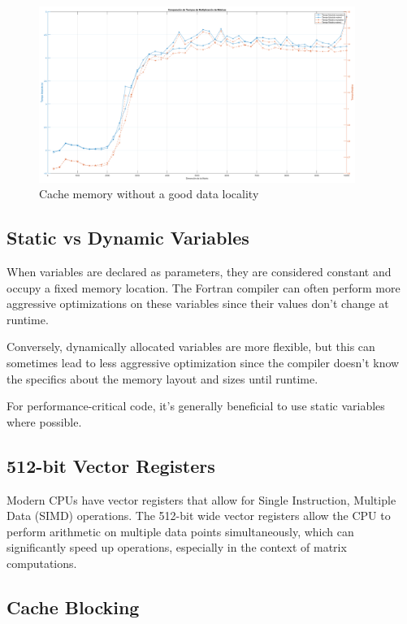 \vspace{0.3em}

\begin{figure}[H]
	\centering
	\includegraphics[width=103mm]{Figures/Imagenes/cache_problem.png}
   \caption{Cache memory without a good data locality}
\end{figure}

\clearpage


\subsection{Static vs Dynamic Variables}

When variables are declared as parameters, they are considered constant and occupy a fixed memory location. The Fortran compiler can often perform more aggressive optimizations on these variables since their values don't change at runtime.

Conversely, dynamically allocated variables are more flexible, but this can sometimes lead to less aggressive optimization since the compiler doesn't know the specifics about the memory layout and sizes until runtime.

For performance-critical code, it's generally beneficial to use static variables where possible.

\subsection{512-bit Vector Registers}

Modern CPUs have vector registers that allow for Single Instruction, Multiple Data (SIMD) operations. The 512-bit wide vector registers allow the CPU to perform arithmetic on multiple data points simultaneously, which can significantly speed up operations, especially in the context of matrix computations.

\subsection{Cache Blocking}


